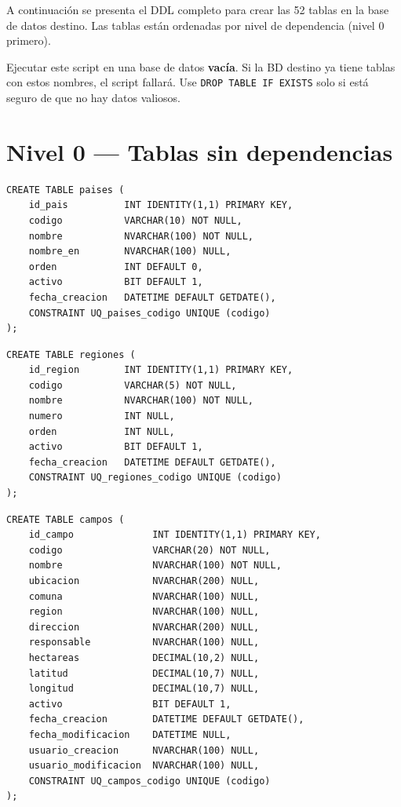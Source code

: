 \documentclass[12pt,a4paper,twoside]{report}
\begin{document}
A continuaci\'on se presenta el DDL completo para crear las 52 tablas en la base de datos destino. Las tablas est\'an ordenadas por nivel de dependencia (nivel 0 primero).

\begin{dangerbox}
Ejecutar este script en una base de datos \textbf{vac\'ia}. Si la BD destino ya tiene tablas con estos nombres, el script fallar\'a. Use \texttt{DROP TABLE IF EXISTS} solo si est\'a seguro de que no hay datos valiosos.
\end{dangerbox}

\section{Nivel 0 --- Tablas sin dependencias}

\begin{lstlisting}[style=sqlstyle, caption={paises}]
CREATE TABLE paises (
    id_pais          INT IDENTITY(1,1) PRIMARY KEY,
    codigo           VARCHAR(10) NOT NULL,
    nombre           NVARCHAR(100) NOT NULL,
    nombre_en        NVARCHAR(100) NULL,
    orden            INT DEFAULT 0,
    activo           BIT DEFAULT 1,
    fecha_creacion   DATETIME DEFAULT GETDATE(),
    CONSTRAINT UQ_paises_codigo UNIQUE (codigo)
);
\end{lstlisting}

\begin{lstlisting}[style=sqlstyle, caption={regiones}]
CREATE TABLE regiones (
    id_region        INT IDENTITY(1,1) PRIMARY KEY,
    codigo           VARCHAR(5) NOT NULL,
    nombre           NVARCHAR(100) NOT NULL,
    numero           INT NULL,
    orden            INT NULL,
    activo           BIT DEFAULT 1,
    fecha_creacion   DATETIME DEFAULT GETDATE(),
    CONSTRAINT UQ_regiones_codigo UNIQUE (codigo)
);
\end{lstlisting}

\begin{lstlisting}[style=sqlstyle, caption={campos}]
CREATE TABLE campos (
    id_campo              INT IDENTITY(1,1) PRIMARY KEY,
    codigo                VARCHAR(20) NOT NULL,
    nombre                NVARCHAR(100) NOT NULL,
    ubicacion             NVARCHAR(200) NULL,
    comuna                NVARCHAR(100) NULL,
    region                NVARCHAR(100) NULL,
    direccion             NVARCHAR(200) NULL,
    responsable           NVARCHAR(100) NULL,
    hectareas             DECIMAL(10,2) NULL,
    latitud               DECIMAL(10,7) NULL,
    longitud              DECIMAL(10,7) NULL,
    activo                BIT DEFAULT 1,
    fecha_creacion        DATETIME DEFAULT GETDATE(),
    fecha_modificacion    DATETIME NULL,
    usuario_creacion      NVARCHAR(100) NULL,
    usuario_modificacion  NVARCHAR(100) NULL,
    CONSTRAINT UQ_campos_codigo UNIQUE (codigo)
);
\end{lstlisting}
\end{document}
